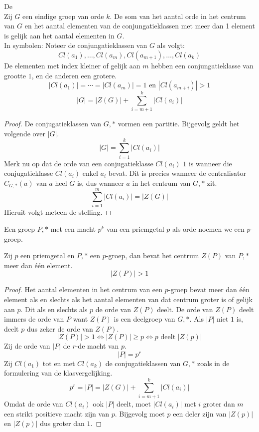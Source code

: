 \documentclass[main.tex]{subfiles}
\begin{document}
\begin{st}
  \label{st:klasvergelijking}
  De \\
  Zij $G$ een eindige groep van orde $k$.
  De som van het aantal orde in het centrum van $G$ en het aantal elementen van de conjungatieklassen met meer dan 1 element is gelijk aan het aantal elementen in $G$.\\
  In symbolen: Noteer de conjungatieklassen van $G$ als volgt:
  \[ Cl(a_{1}),\dotsc, Cl(a_{m}), Cl(a_{m+1}), \dotsc, Cl(a_{k}) \]
  De elementen met index kleiner of gelijk aan $m$ hebben een conjungatieklasse van grootte $1$, en de anderen een grotere.
  \[ |Cl(a_{1})| = \dotsb = |Cl(a_{m})| = 1 \text{ en } |Cl(a_{m+i})| > 1\]
  \[ |G| = |Z(G)| + \sum_{i=m+1}^{k}|Cl(a_{i})| \]

  \begin{proof}
    De conjugatieklassen van $G,*$ vormen een partitie.
    Bijgevolg geldt het volgende over $|G|$.
    \[ |G| = \sum_{i=1}^{k}|Cl(a_{i})| \]
    Merk nu op dat de orde van een conjugatieklasse $Cl(a_{i})$ $1$ is wanneer die conjugatieklasse $Cl(a_{i})$ enkel $a_{i}$ bevat.
    Dit is precies wanneer de centralisator $C_{G,*}(a)$ van $a$ heel $G$ is, dus wanneer $a$ in het centrum van $G,*$ zit.
    \[ \sum_{i=1}^{m}|Cl(a_{i})| = |Z(G)| \]
    Hieruit volgt meteen de stelling.
  \end{proof}
\end{st}

\begin{de}
  Een groep $P,*$ met een macht $p^{k}$ van een priemgetal $p$ als orde noemen we een $p$-groep.
\end{de}

\begin{pr}
  \label{pr:orde-centrum-pgroep-groter-dan-een}
  Zij $p$ een priemgetal en $P,*$ een $p$-groep, dan bevat het centrum $Z(P)$ van $P,*$ meer dan \'e\'en element.
  \[ |Z(P)| > 1 \]
  
  \begin{proof}
    Het aantal elementen in het centrum van een $p$-groep bevat meer dan \'e\'en element als en slechts als het aantal elementen van dat centrum groter is of gelijk aan $p$.
    Dit als en slechts als $p$ de orde van $Z(P)$ deelt.
    De orde van $Z(P)$ deelt immers de orde van $P$ want $Z(P)$ is een deelgroep van $G,*$. 
    Als $|P|$ niet $1$ is, deelt $p$ dus zeker de orde van $Z(P)$.
    \[ |Z(P)| > 1 \Leftrightarrow |Z(P)| \ge p \Leftrightarrow p \text{ deelt } |Z(p)| \]
    Zij de orde van $|P|$ de $r$-de macht van $p$.
    \[ |P| = p^{r} \]
    Zij $Cl(a_{1})$ tot en met $Cl(a_{k})$ de conjugatieklassen van $G,*$ zoals in de formulering van de klasvergelijking.
    \[ p^{r} = |P| = |Z(G)| + \sum_{i=m+1}^{k}|Cl(a_{i})| \]
    Omdat de orde van $Cl(a_{i})$ ook $|P|$ deelt, moet $|Cl(a_{i})|$ met $i$ groter dan $m$ een strikt positieve macht zijn van $p$.
    Bijgevolg moet $p$ een deler zijn van $|Z(p)|$  en $|Z(p)|$ dus groter dan $1$.
  \end{proof}
\end{pr}
\end{document}
